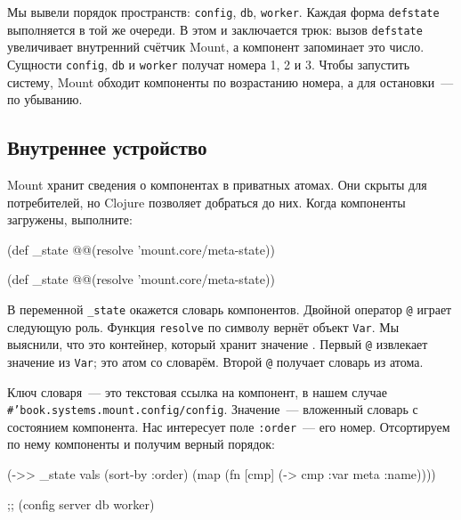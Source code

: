 
Мы вывели порядок пространств: \verb|config|, \verb|db|, \verb|worker|. Каждая
форма \verb|defstate| выполняется в той же очереди. В этом и заключается трюк:
вызов \verb|defstate| увеличивает внутренний счётчик Mount, а компонент
запоминает это число. Сущности \verb|config|, \verb|db| и \verb|worker| получат
номера 1, 2 и 3. Чтобы запустить систему, Mount обходит компоненты по
возрастанию номера, а для остановки~--- по убыванию.

\subsection{Внутреннее устройство}

Mount хранит сведения о компонентах в приватных атомах. Они скрыты для
потребителей, но Clojure позволяет добраться до них. Когда компоненты загружены,
выполните:

\ifnarrow

\begin{english}
  \begin{clojure}
(def _state
  @@(resolve 'mount.core/meta-state))
  \end{clojure}
\end{english}

\else

\begin{english}
  \begin{clojure}
(def _state @@(resolve 'mount.core/meta-state))
  \end{clojure}
\end{english}

\fi


В переменной \verb|_state| окажется словарь компонентов. Двойной оператор
\verb|@| играет следующую роль. Функция \verb|resolve| по символу вернёт
объект \verb|Var|. Мы выяснили, что это контейнер, который хранит
значение . Первый \verb|@| извлекает значение из
\verb|Var|; это атом со словарём. Второй \verb|@| получает словарь из атома.

\mnoindent Ключ словаря~--- это текстовая ссылка на компонент, в нашем случае
\texttt{\#'book.systems.mount\-.config/config}. Значение~--- вложенный словарь с
состоянием компонента. Нас интересует поле \verb|:order|~--- его
номер. Отсортируем по нему компоненты и получим верный порядок:

\begin{english}
  \begin{clojure}
(->> _state
     vals
     (sort-by :order)
     (map (fn [cmp]
            (-> cmp :var meta :name))))

;; (config server db worker)
  \end{clojure}
\end{english}

